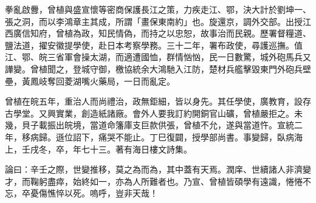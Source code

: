 \begin{pinyinscope}
拳亂啟釁，曾植與盛宣懷等密商保護長江之策，力疾走江、鄂，決大計於劉坤一、張之洞，而以李鴻章主其成，所謂「畫保東南約」也。旋還京，調外交部。出授江西廣信知府，曾植為政，知民情偽，而持之以忠恕，故事治而民親。歷署督糧道、鹽法道，擢安徽提學使，赴日本考察學務。三十二年，署布政使，尋護巡撫。值江、鄂、皖三省軍會操太湖，而適遭國恤，群情忷忷，民一日數驚，城外砲馬兵又譁變。曾植聞之，登城守御，檄協統余大鴻馳入江防，楚材兵艦擊毀東門外砲兵壁壘，黃鳳岐奪回菱湖嘴火藥局，一日而亂定。

曾植在皖五年，重治人而尚禮治，政無鉅細，皆以身先。其任學使，廣教育，設存古學堂。又興實業，創造紙諸廠。會外人要我訂約開銅官山礦，曾植嚴拒之。未幾，貝子載振出皖境，當道命籓庫支巨款供張，曾植不允，遂與當道忤。宣統二年，移病歸。遜位詔下，痛哭不能止。丁巳復闢，授學部尚書。事變歸，臥病海上，壬戌冬，卒，年七十三。著有海日樓文詩集。

論曰：辛壬之際，世變推移，莫之為而為，其中蓋有天焉。潤庠、世續諸人非濟變才，而鞠躬盡瘁，始終如一，亦為人所難者也。乃宣、曾植皆碩學有遠識，惓惓不忘，卒憂傷憔悴以死。嗚呼，豈非天哉！


\end{pinyinscope}
